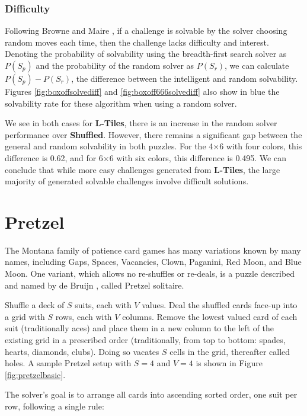 \documentclass[journal]{IEEEtran}
\begin{document}
\subsubsection{Difficulty}

Following Browne and Maire \cite{MCPUZZLE}, if a challenge is solvable by the solver choosing random moves each time, then the challenge lacks difficulty and interest. Denoting the probability of solvability using the breadth-first search solver as $P(S_p)$ and the probability of the random solver as $P(S_r)$, we can calculate $P(S_p) - P(S_r)$, the difference between the intelligent and random solvability. Figures \ref{fig:boxoffsolvediff} and \ref{fig:boxoff666solvediff} also show in blue the solvability rate for these algorithm when using a random solver. 

We see in both cases for {\bf L-Tiles}, there is an increase in the random solver performance over {\bf Shuffled}. However, there remains a significant gap between the general and random solvability in both puzzles. For the 4$\times$6 with four colors, this difference is 0.62, and for 6$\times$6 with six colors, this difference is 0.495. We can conclude that while more easy challenges generated from {\bf L-Tiles}, the large majority of generated solvable challenges involve difficult solutions.


\section{Pretzel}
The Montana family of patience card games has many variations known by many names, including Gaps, Spaces, Vacancies, Clown, Paganini, Red Moon, and Blue Moon. One variant, which allows no re-shuffles or re-deals, is a puzzle described and named by de Bruijn \cite{helmstetter2004searching}, called Pretzel solitaire.

Shuffle a deck of $S$ suits, each with $V$ values. Deal the shuffled cards face-up into a grid with $S$ rows, each with $V$ columns. Remove the lowest valued card of each suit (traditionally aces) and place them in a new column to the left of the existing grid in a prescribed order (traditionally, from top to bottom: spades, hearts, diamonds, clubs). Doing so vacates $S$ cells in the grid, thereafter called holes. A sample Pretzel setup with $S=4$ and $V=4$ is shown in Figure \ref{fig:pretzelbasic}.

The solver's goal is to arrange all cards into ascending sorted order, one suit per row, following a single rule:
\end{document}
